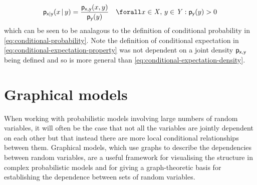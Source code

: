 \begin{equation}\label{eq:conditional-density}
  \pden{\rvar{x}|\rvar{y}}(x\gvn y) =
  \frac{\pden{\rvar{x},\rvar{y}}(x,y)}{\pden{\rvar{y}}(y)}
  \quad \forall x \in \set{X},\, y \in \set{Y} : \pden{\rvar{y}}(y) > 0
\end{equation}
which can be seen to be analagous to the definition of conditional probability in \eqref{eq:conditional-probability}. Note the definition of conditional expectation in \eqref{eq:conditional-expectation-property} was not dependent on a joint density $\mathsf{p}_{\mathsf{x},\mathsf{y}}$ being defined and so is more general than \eqref{eq:conditional-expectation-density}.

\section{Graphical models}\label{sec:graphical-models}

When working with probabilistic models involving large numbers of random variables, it will often be the case that not all the variables are jointly dependent on each other but that instead there are more local conditional relationships between them. Graphical models, which use graphs to describe the dependencies between random variables, are a useful framework for visualising the structure in complex probabilistic models and for giving a graph-theoretic basis for establishing the dependence between sets of random variables.

